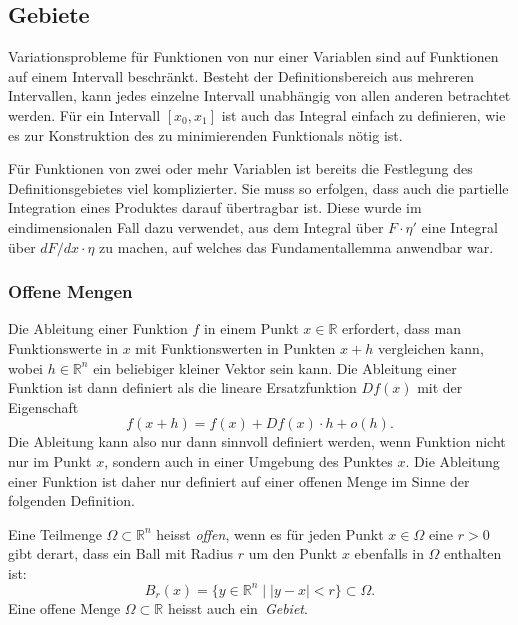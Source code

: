 %
%
%

%
%
\subsection{Gebiete}
Variationsprobleme für Funktionen von nur einer Variablen sind auf 
Funktionen auf einem Intervall beschränkt.
Besteht der Definitionsbereich aus mehreren Intervallen, kann jedes
einzelne Intervall unabhängig von allen anderen betrachtet werden.
Für ein Intervall $[x_0,x_1]$ ist auch das Integral einfach zu definieren,
wie es zur Konstruktion des zu minimierenden Funktionals nötig ist.

Für Funktionen von zwei oder mehr Variablen ist bereits die
Festlegung des Definitionsgebietes viel komplizierter.
Sie muss so erfolgen, dass auch die partielle Integration eines
Produktes darauf übertragbar ist.
Diese wurde im eindimensionalen Fall dazu verwendet, aus dem Integral
über $F\cdot\eta'$ eine Integral über $dF/dx\cdot \eta$ zu
machen, auf welches das Fundamentallemma anwendbar war.

%
%
\subsubsection{Offene Mengen}
Die Ableitung einer Funktion $f$ in einem Punkt $x\in\mathbb{R}$ erfordert,
dass man Funktionswerte in $x$ mit Funktionswerten in Punkten $x+h$
vergleichen kann, wobei $h\in\mathbb{R}^n$ ein beliebiger kleiner Vektor
sein kann.
Die Ableitung einer Funktion ist dann definiert als die lineare
Ersatzfunktion $Df(x)$ mit der Eigenschaft
\[
f(x+h) = f(x) + Df(x)\cdot h + o(h).
\]
Die Ableitung kann also nur dann sinnvoll definiert werden, wenn
Funktion nicht nur im Punkt $x$, sondern auch in einer Umgebung
des Punktes $x$.
Die Ableitung einer Funktion ist daher nur definiert auf einer
offenen Menge im Sinne der folgenden Definition.


\begin{definition}
Eine Teilmenge $\Omega\subset\mathbb{R}^n$ heisst {\em offen}, wenn es für
%
jeden Punkt $x\in\Omega$ eine $r>0$ gibt derart, dass ein
Ball mit Radius $r$ um den Punkt $x$ ebenfalls in $\Omega$ enthalten
ist:
\[
B_r(x)
=
\{y\in\mathbb{R}^n
\mid
|y-x|<r\}
\subset \Omega.
\]
Eine offene Menge $\Omega\subset\mathbb{R}$ heisst auch ein {\em Gebiet}.
%
\end{definition}

